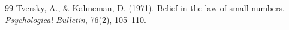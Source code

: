 \begin{thebibliography}{99}
Tversky, A., \& Kahneman, D. (1971).
Belief in the law of small numbers.
\textit{Psychological Bulletin}, 76(2), 105--110.
\end{thebibliography}
